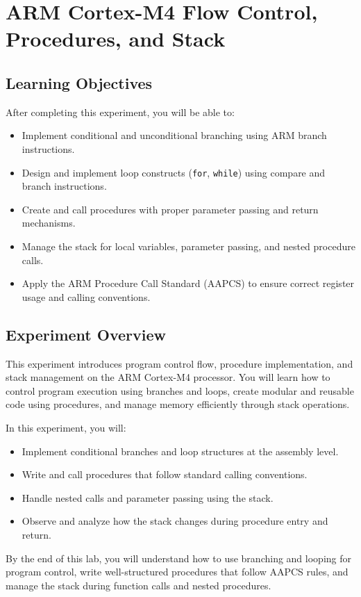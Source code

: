 \chapter{ARM Cortex-M4 Flow Control, Procedures, and Stack}

\section*{Learning Objectives}
After completing this experiment, you will be able to:
\begin{itemize}[nosep]
  \item Implement conditional and unconditional branching using ARM branch instructions.
  \item Design and implement loop constructs (\texttt{for}, \texttt{while}) using compare and branch instructions.
  \item Create and call procedures with proper parameter passing and return mechanisms.
  \item Manage the stack for local variables, parameter passing, and nested procedure calls.
  \item Apply the ARM Procedure Call Standard (AAPCS) to ensure correct register usage and calling conventions.
\end{itemize}

\section*{Experiment Overview}
This experiment introduces program control flow, procedure implementation, and stack management on the ARM Cortex-M4 processor. 
You will learn how to control program execution using branches and loops, create modular and reusable code using procedures, and manage memory efficiently through stack operations.

\noindent In this experiment, you will:
\begin{itemize}[nosep]
  \item Implement conditional branches and loop structures at the assembly level.
  \item Write and call procedures that follow standard calling conventions.
  \item Handle nested calls and parameter passing using the stack.
  \item Observe and analyze how the stack changes during procedure entry and return.
\end{itemize}

By the end of this lab, you will understand how to use branching and looping for program control, write well-structured procedures that follow AAPCS rules, and manage the stack during function calls and nested procedures.

